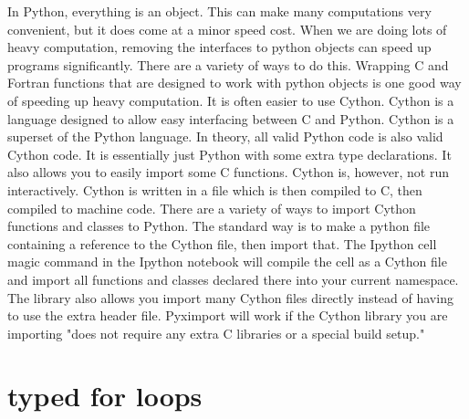

In Python, everything is an object.
This can make many computations very convenient, but it does come at a minor speed cost.
When we are doing lots of heavy computation, removing the interfaces to python objects can speed up programs significantly.
There are a variety of ways to do this.
Wrapping C and Fortran functions that are designed to work with python objects is one good way of speeding up heavy computation.
It is often easier to use Cython.
Cython is a language designed to allow easy interfacing between C and Python.
Cython is a superset of the Python language.
In theory, all valid Python code is also valid Cython code.
It is essentially just Python with some extra type declarations.
It also allows you to easily import some C functions.
Cython is, however, not run interactively.
Cython is written in a  file which is then compiled to C, then compiled to machine code.
There are a variety of ways to import Cython functions and classes to Python.
The standard way is to make a python file containing a reference to the Cython file, then import that.
The Ipython  cell magic command in the Ipython notebook will compile the cell as a Cython file and import all functions and classes declared there into your current namespace.
The library  also allows you import many Cython files directly instead of having to use the extra header file.
Pyximport will work if the Cython library you are importing "does not require any extra C libraries or a special build setup."

\section*{typed for loops}


